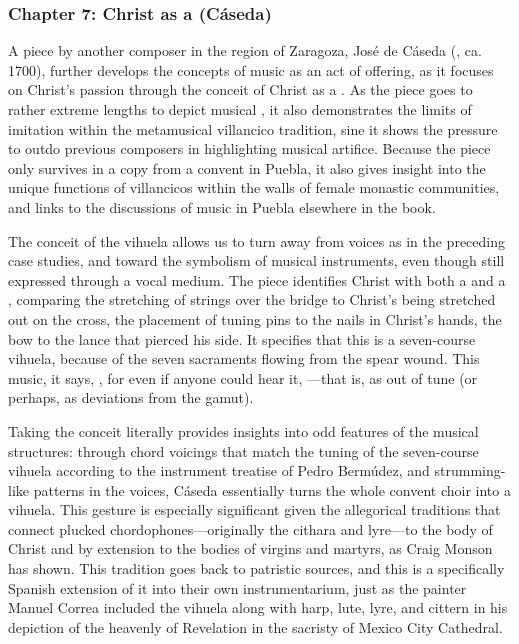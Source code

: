 \documentclass[tt]{vcbook-proposal}
\begin{document}
\subsubsection{Chapter 7: Christ as a  (Cáseda)}

A piece by another composer in the region of Zaragoza, José de Cáseda (, ca. 1700), further develops the concepts of music as an act of offering, as it focuses on Christ's passion through the conceit of Christ as a . 
As the piece goes to rather extreme lengths to depict musical , it also demonstrates the limits of imitation within the metamusical villancico tradition, sine it shows the pressure to outdo previous composers in highlighting musical artifice.
Because the piece only survives in a copy from a convent in Puebla, it also gives insight into the unique functions of villancicos within the walls of female monastic communities, and links to the discussions of music in Puebla elsewhere in the book.

The conceit of the vihuela allows us to turn away from voices as in the preceding case studies, and toward the symbolism of musical instruments, even though still expressed through a vocal medium.
The piece identifies Christ with both a  and a , comparing the stretching of strings over the bridge to Christ's being stretched out on the cross, the placement of tuning pins to the nails in Christ's hands, the bow to the lance that pierced his side.
It specifies that this is a seven-course vihuela, because of the seven sacraments flowing from the spear wound.
This music, it says, , for even if anyone could hear it, ---that is, as out of tune (or perhaps, as  deviations from the gamut). 

Taking the conceit literally provides insights into odd features of the musical structures: through chord voicings that match the tuning of the seven-course vihuela according to the instrument treatise of Pedro Bermúdez, and strumming-like patterns in the voices, Cáseda essentially turns the whole convent choir into a vihuela.
This gesture is especially significant given the allegorical traditions that connect plucked chordophones---originally the cithara and lyre---to the body of Christ and by extension to the bodies of virgins and martyrs, as Craig Monson has shown.
This tradition goes back to patristic sources, and this is a specifically Spanish extension of it into their own instrumentarium, just as the painter Manuel Correa included the vihuela along with harp, lute, lyre, and cittern in his depiction of the heavenly  of Revelation in the sacristy of Mexico City Cathedral.
\end{document}
